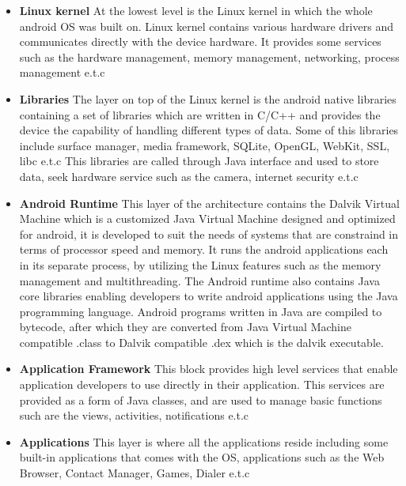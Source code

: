  \begin{itemize}

\item{\bf Linux kernel}
 At the lowest level is the Linux kernel in which the whole android OS was built on. Linux kernel contains various hardware drivers and communicates directly with the device hardware. It provides some services such as the hardware management, memory management, networking, process management e.t.c
 
 \item{\bf Libraries}
 The layer on top of the Linux kernel is the android native libraries containing a set of libraries which are written in C/C++ and provides the device the capability of handling different types of data. Some of this libraries include surface manager, media framework, SQLite, OpenGL, WebKit, SSL, libc e.t.c This libraries are called through Java interface and used to store data, seek hardware service such as the camera, internet security e.t.c
 
\item{\bf Android Runtime}
 This layer of the architecture contains the Dalvik Virtual Machine which is a customized Java Virtual Machine designed and optimized for android, it is developed to suit the needs of systems that are constraind in terms of processor speed and memory. It runs the android applications each in its separate process, by utilizing the Linux features such as the memory management and multithreading. The Android runtime also contains Java core libraries enabling developers to write android applications using the Java programming language. Android programs written in Java are compiled to bytecode, after which they are converted from Java Virtual Machine compatible .class to Dalvik compatible .dex which is the dalvik executable. 
 
 \item{\bf Application Framework}
 This block provides high level services that enable application developers to use directly in their application. This services are provided as a form of Java classes, and are used to manage basic functions such are the views, activities, notifications e.t.c
 
 \item{\bf Applications}
 This layer is where all the applications reside including some built-in applications that comes with the OS, applications such as the Web Browser, Contact Manager, Games, Dialer e.t.c 
 
\end{itemize}

